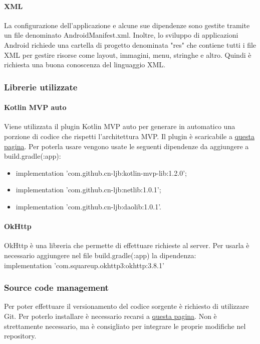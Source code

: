 \paragraph{XML}
La configurazione dell'applicazione e alcune sue dipendenze sono gestite tramite un file denominato AndroidManifest.xml. Inoltre, lo sviluppo di applicazioni Android richiede una cartella di progetto denominata "res" che contiene tutti i file XML per gestire risorse come layout, immagini, menu, stringhe e altro. Quindi è richiesta una buona conoscenza del linguaggio XML.

\subsubsection{Librerie utilizzate}

\paragraph{Kotlin MVP auto}
Viene utilizzata il plugin Kotlin MVP auto per generare in automatico una porzione di codice che rispetti l'architettura MVP. Il plugin è scaricabile a \href{https://plugins.jetbrains.com/plugin/12265-kotlin-mvp-auto}{questa pagina}.
Per poterla usare vengono usate le seguenti dipendenze da aggiungere a build.gradle(:app):\\
\begin{itemize}
	\item implementation 'com.github.cn-ljb:kotlin-mvp-lib:1.2.0'; \\
	\item implementation 'com.github.cn-ljb:netlib:1.0.1'; \\
	\item implementation 'com.github.cn-ljb:daolib:1.0.1'. \\
\end{itemize}

\paragraph{OkHttp}
OkHttp è una libreria che permette di effettuare richieste al server.
Per usarla è necessario aggiungere nel file build.gradle(:app) la dipendenza:\\
implementation 'com.squareup.okhttp3:okhttp:3.8.1'


\subsubsection{Source code management}
Per poter effettuare il versionamento del codice sorgente è richiesto di utilizzare Git. Per poterlo installare è necessario recarsi a \href{https://git-scm.com/downloads}{questa pagina}.
Non è strettamente necessario, ma è consigliato per integrare le proprie modifiche nel repository.


